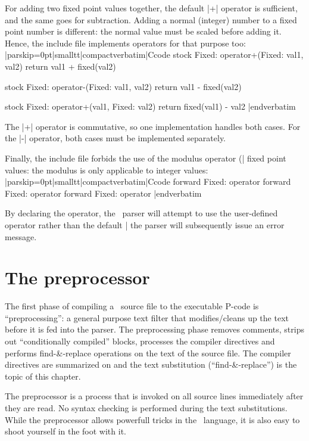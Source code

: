For adding two fixed point values together, the default |+| operator is
sufficient, and the same goes for subtraction. Adding a normal (integer)
number to a fixed point number is different: the normal value must be
scaled before adding it. Hence, the include file implements operators for
that purpose too:
\listingx\verbatim|parskip=0pt|smalltt|compactverbatim|Ccode
stock Fixed: operator+(Fixed: val1, val2)
    return val1 + fixed(val2)

stock Fixed: operator-(Fixed: val1, val2)
    return val1 - fixed(val2)

stock Fixed: operator+(val1, Fixed: val2)
    return fixed(val1) - val2
|endverbatim\endlistingx

The |+| operator is commutative, so one implementation handles both cases. For
the |-| operator, both cases must be implemented separately.

Finally, the include file forbids the use of the modulus operator (|%
fixed point values: the modulus is only applicable to integer values:
\listingx\verbatim|parskip=0pt|smalltt|compactverbatim|Ccode
forward Fixed: operator%
forward Fixed: operator%
forward Fixed: operator%
|endverbatim\endlistingx

By declaring the operator, the \Small\ parser will attempt to use the user-defined
operator rather than the default |%
the parser will subsequently issue an error message.


\vfill\eject
{}%

\chapter{The preprocessor}
The first phase of compiling a \Small\ source file to the executable P-code is
``preprocessing'': a general purpose text filter that modifies\slash cleans up
the text before it is fed into the parser. The preprocessing phase removes
comments, strips out ``conditionally compiled'' blocks, processes the compiler
directives and performs find-\&-replace operations on the text of the source
file. The compiler directives are summarized on  and the
text substitution (``find-\&-replace'') is the topic of this chapter.

The preprocessor is a process that is invoked on all source
lines immediately after they are read. No syntax checking is performed during
the text substitutions. While the preprocessor allows powerfull tricks in the
\Small\ language, it is also easy to shoot yourself in the foot with it.

